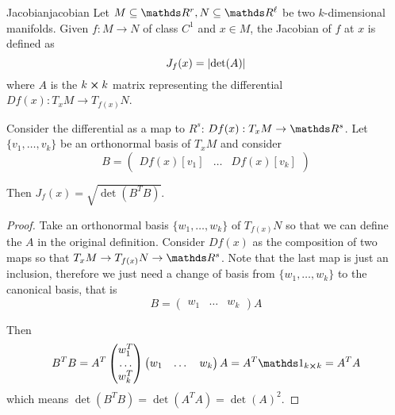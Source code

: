 \documentclass[12pt]{extarticle}
\begin{document}
\begin{definition}{Jacobian}{jacobian}
	Let $M \subseteq \R^r, N \subseteq \R^\ell$ be two $k$-dimensional manifolds.
	Given $f: M \to N$ of class $C^1$ and $x \in M$, the Jacobian of $f$ at $x$ is defined as
	\begin{equation}
		J_f(x) = \abs{\det(A)}
	\end{equation}
	where $A$ is the $k\cross k$ matrix representing the differential $Df(x): T_x M \to T_{f(x)} N$.
\end{definition}

\begin{proposition}{}{}
	Consider the differential as a map to $R^s$: $Df(x): T_x M \to \R^s$.
	Let $\{v_1, \dots, v_k\}$ be an orthonormal basis of $T_x M$ and consider
	\begin{equation}
		B = \begin{pmatrix}
			Df(x) [v_1] & \dots & Df(x) [v_k]
		\end{pmatrix}
	\end{equation}

	Then $J_f(x) = \sqrt{\det(B^T B)}$.
\end{proposition}

\begin{proof}
	Take an orthonormal basis $\{w_1, \dots, w_k \}$ of $T_{f(x)} N$ so that we can define the $A$ in
	the original definition.
	Consider $Df(x)$ as the composition of two maps so that $T_x M \to T_{f(x)} N \to \R^s$.
	Note that the last map is just an inclusion, therefore we just need a change of basis from
	$\{w_1, \dots, w_k\}$ to the canonical basis, that is
	\begin{equation}
		B =
		\begin{pmatrix}
			w_1 & \dots & w_k
		\end{pmatrix} A
	\end{equation}

	Then
	\begin{equation}
		B^T B = A^T \begin{pmatrix} w_1^T \\ \dots \\ w_k^T \end{pmatrix}
		\begin{pmatrix} w_1 & \dots & w_k \end{pmatrix} A
		= A^T \mathds 1_{k \cross k} = A^T A
	\end{equation}
	which means $\det(B^T B) = \det(A^T A) = \det(A)^2$.
\end{proof}
\end{document}
